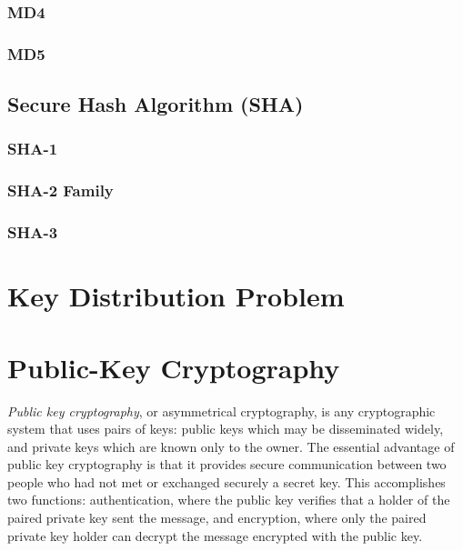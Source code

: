 \documentclass{article}
\theoremstyle{quest}
\begin{document}
\subsubsection{MD4}

\subsubsection{MD5}

\subsection{Secure Hash Algorithm (SHA)}

\subsubsection{SHA-1}

\subsubsection{SHA-2 Family}

\subsubsection{SHA-3}

\section{Key Distribution Problem}

\section{Public-Key Cryptography}
\textit{Public key cryptography}, or asymmetrical cryptography,
is any cryptographic system that uses pairs of keys: public keys which may be disseminated widely,
and private keys which are known only to the owner.
The essential advantage of public key cryptography is that it provides secure communication between two people who had not met or exchanged securely a secret key.
This accomplishes two functions: authentication, where the public key verifies that a holder of the paired private key sent the message,
and encryption, where only the paired private key holder can decrypt the message encrypted with the public key.
\end{document}
